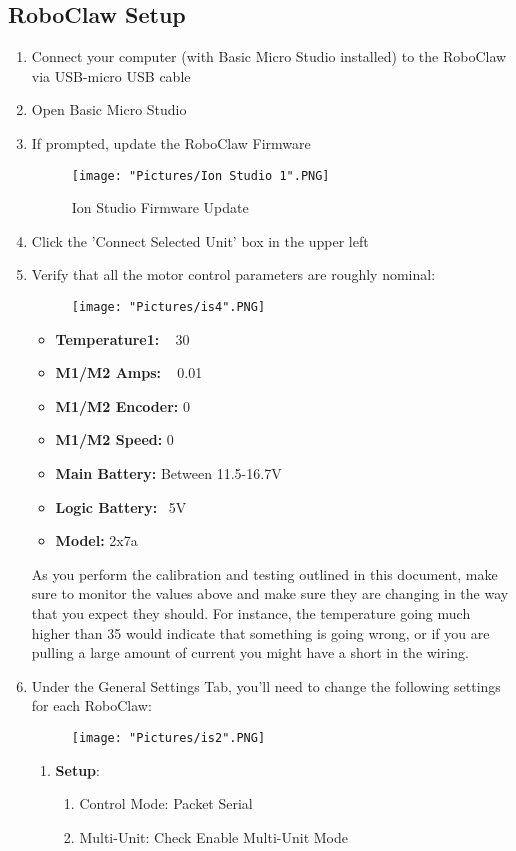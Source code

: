\documentclass[12pt]{article}
\begin{document}
\subsection{RoboClaw Setup}
\begin{enumerate}
	\item Connect your computer (with Basic Micro Studio installed) to the RoboClaw via USB-micro USB cable
	\item Open Basic Micro Studio
	\item If prompted, update the RoboClaw Firmware
	\begin{figure}[H]
 		\centering
		\texttt{[image: "Pictures/Ion Studio 1".PNG]}
 		\caption{Ion Studio Firmware Update}
	\end{figure}
	
	\item Click the 'Connect Selected Unit' box in the upper left
	\item Verify that all the motor control parameters are roughly nominal:
	\begin{figure}[H]
 		\centering
		\texttt{[image: "Pictures/is4".PNG]}
 		\caption{}
	\end{figure}
	\begin{itemize}
		\item \textbf{Temperature1:} ~ 30
		\item \textbf{M1/M2 Amps:} ~ 0.01
		\item \textbf{M1/M2 Encoder:} 0
		\item \textbf{M1/M2 Speed:} 0
		\item \textbf{Main Battery:} Between 11.5-16.7V
		\item \textbf{Logic Battery:} ~5V
		\item \textbf{Model:} 2x7a
	\end{itemize}
	\noindent As you perform the calibration and testing outlined in this document, make sure to monitor the values above and make sure they are changing in the way that you expect they should. For instance, the temperature going much higher than 35 would indicate that something is going wrong, or if you are pulling a large amount of current you might have a short in the wiring. 
	\item Under the General Settings Tab, you'll need to change the following settings for each RoboClaw:
	\begin{figure}[H]
 		\centering
		\texttt{[image: "Pictures/is2".PNG]}
 		\caption{}
	\end{figure}
	\begin{enumerate}
		\item \textbf{Setup}:
		\begin{enumerate}
			\item Control Mode: Packet Serial
			\item Multi-Unit: Check Enable Multi-Unit Mode
		\end{enumerate}


\end{enumerate}
\end{enumerate}
\end{document}
